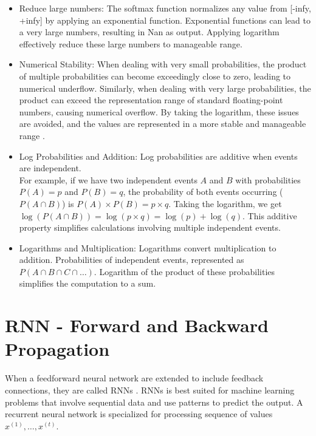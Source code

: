 \begin{itemize}
    \item Reduce large numbers:  The softmax function normalizes any value from [-infy, +infy] by applying an exponential function. Exponential functions can lead to a very large numbers, resulting in  Nan as output. Applying logarithm effectively reduce these large numbers to manageable range.
    \item Numerical Stability: When dealing with very small probabilities, the product of multiple probabilities can become exceedingly close to zero, leading to numerical underflow. Similarly, when dealing with very large probabilities, the product can exceed the representation range of standard floating-point numbers, causing numerical overflow. By taking the logarithm, these issues are avoided, and the values are represented in a more stable and manageable range \parencite[Page 79]{Goodfellow-et-al-2016}.
    
    \item Log Probabilities and Addition: Log probabilities are additive when events are independent.\\ For example, if we have two independent events \(A\) and \(B\) with probabilities \(P(A) = p\) and \(P(B) = q\), the probability of both events occurring (\(P(A \cap B)\)) is \(P(A) \times P(B) = p \times q\). Taking the logarithm, we get \(\log(P(A \cap B)) = \log(p \times q) = \log(p) + \log(q)\). This additive property simplifies calculations involving multiple independent events.

    \item Logarithms and Multiplication: Logarithms convert multiplication to addition. Probabilities of independent events,  represented as \(P(A \cap B \cap C \cap \ldots)\). Logarithm of the product of these probabilities simplifies the computation to a sum. 
\end{itemize}

\section{ \acs*{RNN} - Forward and Backward Propagation} \label{sec:math-rnn}

When a feedforward neural network are extended to include feedback connections, they are called \acfp{RNN} \parencite[Chapter 6, Page 164]{Goodfellow-et-al-2016}. \acfp{RNN} is best suited for machine learning problems that involve sequential data and use patterns to predict the output. A recurrent neural network is specialized for processing sequence of values $ x^{(1)},\ldots,x^{(t)}$. 

